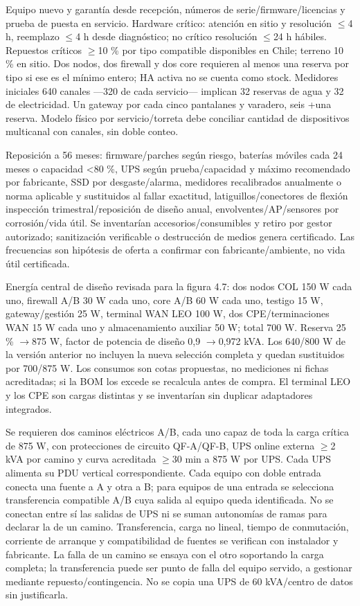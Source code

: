 \documentclass[11pt,letterpaper]{report}
\begin{document}
Equipo nuevo y garantía desde recepción, números de serie/firmware/licencias y prueba de puesta en servicio. Hardware crítico: atención en sitio y resolución $\leq$4 h, reemplazo $\leq$4 h desde diagnóstico; no crítico resolución $\leq$24 h hábiles. Repuestos críticos $\geq$10 \% por tipo compatible disponibles en Chile; terreno 10 \% en sitio. Dos nodos, dos firewall y dos core requieren al menos una reserva por tipo si ese es el mínimo entero; HA activa no se cuenta como stock. Medidores iniciales 640 canales ---320 de cada servicio--- implican 32 reservas de agua y 32 de electricidad. Un gateway por cada cinco pantalanes y varadero, seis +una reserva. Modelo físico por servicio/torreta debe conciliar cantidad de dispositivos multicanal con canales, sin doble conteo.

Reposición a 56 meses: firmware/parches según riesgo, baterías móviles cada 24 meses o capacidad <80 \%, UPS según prueba/capacidad y máximo recomendado por fabricante, SSD por desgaste/alarma, medidores recalibrados anualmente o norma aplicable y sustituidos al fallar exactitud, latiguillos/conectores de flexión inspección trimestral/reposición de diseño anual, envolventes/AP/sensores por corrosión/vida útil. Se inventarían accesorios/consumibles y retiro por gestor autorizado; sanitización verificable o destrucción de medios genera certificado. Las frecuencias son hipótesis de oferta a confirmar con fabricante/ambiente, no vida útil certificada.

Energía central de diseño revisada para la figura 4.7: dos nodos COL 150 W cada uno, firewall A/B 30 W cada uno, core A/B 60 W cada uno, testigo 15 W, gateway/gestión 25 W, terminal WAN LEO 100 W, dos CPE/terminaciones WAN 15 W cada uno y almacenamiento auxiliar 50 W; total 700 W. Reserva 25 \% $\rightarrow$875 W, factor de potencia de diseño 0,9 $\rightarrow$0,972 kVA. Los 640/800 W de la versión anterior no incluyen la nueva selección completa y quedan sustituidos por 700/875 W. Los consumos son cotas propuestas, no mediciones ni fichas acreditadas; si la BOM los excede se recalcula antes de compra. El terminal LEO y los CPE son cargas distintas y se inventarían sin duplicar adaptadores integrados.

Se requieren dos caminos eléctricos A/B, cada uno capaz de toda la carga crítica de 875 W, con protecciones de circuito QF-A/QF-B, UPS online externa $\geq$2 kVA por camino y curva acreditada $\geq$30 min a 875 W por UPS. Cada UPS alimenta su PDU vertical correspondiente. Cada equipo con doble entrada conecta una fuente a A y otra a B; para equipos de una entrada se selecciona transferencia compatible A/B cuya salida al equipo queda identificada. No se conectan entre sí las salidas de UPS ni se suman autonomías de ramas para declarar la de un camino. Transferencia, carga no lineal, tiempo de conmutación, corriente de arranque y compatibilidad de fuentes se verifican con instalador y fabricante. La falla de un camino se ensaya con el otro soportando la carga completa; la transferencia puede ser punto de falla del equipo servido, a gestionar mediante repuesto/contingencia. No se copia una UPS de 60 kVA/centro de datos sin justificarla.
\end{document}
